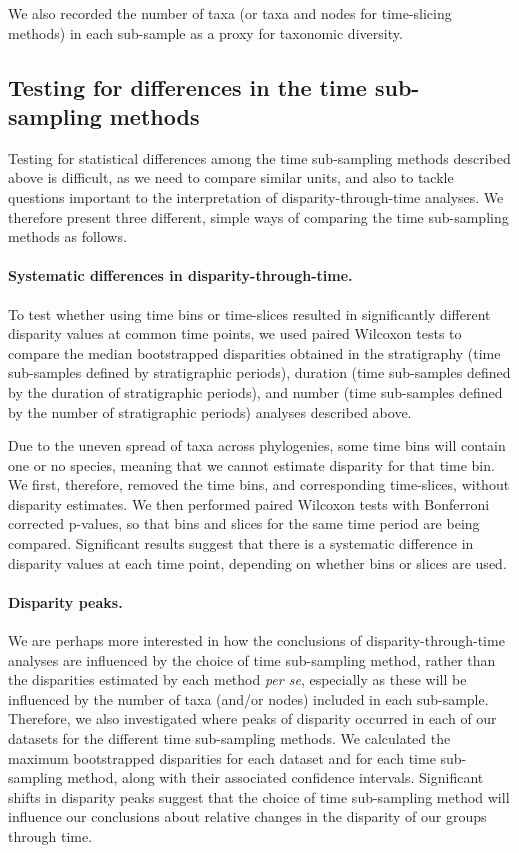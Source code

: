 \documentclass[12pt,a4paper]{article}
\begin{document}
We also recorded the number of taxa (or taxa and nodes for time-slicing methods) in each sub-sample as a proxy for taxonomic diversity. 

\subsection{Testing for differences in the time sub-sampling methods}
\label{testing}
Testing for statistical differences among the time sub-sampling methods described above is difficult, as we need to compare similar units, and also to tackle questions important to the interpretation of disparity-through-time analyses. 
We therefore present three different, simple ways of comparing the time sub-sampling methods as follows.

\paragraph{Systematic differences in disparity-through-time.} 
To test whether using time bins or time-slices resulted in significantly different disparity values at common time points, we used paired Wilcoxon tests to compare the median bootstrapped disparities obtained in the stratigraphy (time sub-samples defined by stratigraphic periods), duration (time sub-samples defined by the duration of stratigraphic periods), and number (time sub-samples defined by the number of stratigraphic periods) analyses described above.

Due to the uneven spread of taxa across phylogenies, some time bins will contain one or no species, meaning that we cannot estimate disparity for that time bin. 
We first, therefore, removed the time bins, and corresponding time-slices, without disparity estimates. 
We then performed paired Wilcoxon tests with Bonferroni corrected p-values, so that bins and slices for the same time period are being compared. 
Significant results suggest that there is a systematic difference in disparity values at each time point, depending on whether bins or slices are used.

\paragraph{Disparity peaks.}
We are perhaps more interested in how the conclusions of disparity-through-time analyses are influenced by the choice of time sub-sampling method, rather than the disparities estimated by each method \textit{per se}, especially as these will be influenced by the number of taxa (and/or nodes) included in each sub-sample. 
Therefore, we also investigated where peaks of disparity occurred in each of our datasets for the different time sub-sampling methods. 
We calculated the maximum bootstrapped disparities for each dataset and for each time sub-sampling method, along with their associated confidence intervals.
Significant shifts in disparity peaks suggest that the choice of time sub-sampling method will influence our conclusions about relative changes in the disparity of our groups through time. 
\end{document}
